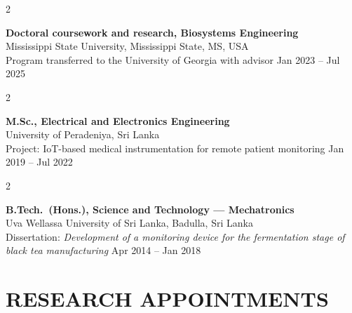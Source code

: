 \documentclass[10pt, letterpaper]{article}
\newenvironment{twocolentry}[2][]{%
    \onecolentry
    \def\secondColumn{#2}
    \setcolumnwidth{\fill, 4.2cm}
    \begin{paracol}{2}
}{%
    \switchcolumn \raggedleft \secondColumn
    \end{paracol}
    \endonecolentry
}
\begin{document}
\begin{twocolentry}{Jan 2023 -- Jul 2025}
    \textbf{Doctoral coursework and research, Biosystems Engineering} \\
    Mississippi State University, Mississippi State, MS, USA \\
    Program transferred to the University of Georgia with advisor
    \vspace{0.12cm}
\end{twocolentry}

\begin{twocolentry}{Jan 2019 -- Jul 2022}
    \textbf{M.Sc., Electrical and Electronics Engineering} \\
    University of Peradeniya, Sri Lanka \\
    Project: IoT-based medical instrumentation for remote patient monitoring
    \vspace{0.12cm}
\end{twocolentry}

\begin{twocolentry}{Apr 2014 -- Jan 2018}
    \textbf{B.Tech.\ (Hons.), Science and Technology --- Mechatronics} \\
    Uva Wellassa University of Sri Lanka, Badulla, Sri Lanka \\
    Dissertation: \emph{Development of a monitoring device for the fermentation stage of
    black tea manufacturing}
    \vspace{0.08cm}
\end{twocolentry}

\section{RESEARCH APPOINTMENTS}
\vspace{0.08cm}
\end{document}
